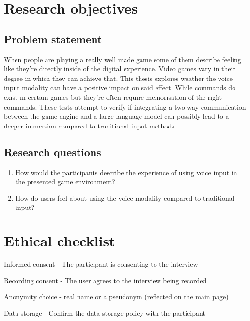 

\section{Research objectives}

\subsection{Problem statement}

When  people are  playing a really well made game some of them  describe feeling like they're directly inside of the digital experience.
Video games vary in their degree in which they can achieve that. This thesis explores weather the voice input modality can have a positive impact on said effect. 
While commands do exist in certain games but they're often require memorisation of the right commands.
These tests attempt to verify if integrating a two way communication between the game engine and a large language model can possibly lead to a deeper immersion compared to traditional input methods.

\subsection{Research questions}

\begin{enumerate}
    \item How would the participants describe the experience of using voice input in the presented
game environment?
    \item How do users feel about using the voice modality compared to traditional input?
\end{enumerate}

\section{Ethical checklist}
    \begin{todolist}
    \item Informed consent - The participant is consenting to the interview
    \item Recording consent - The user agrees to the interview being recorded
    \item Anonymity choice - real name or a pseudonym (reflected on the main page)
    \item Data storage - Confirm the data storage policy with the participant
    \end{todolist}

